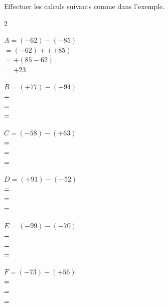 \documentclass[11pt]{article}
\begin{document}
\begin{exercice}[3]
Effectuer les calculs suivants comme dans l'exemple.

\begin{multicols}{2}

$A = (-62) - (-85)$\\
$= (-62) + (+85)$\\
$= +(85 - 62)$\\
$= +23$

\bigskip

$B = (+77) - (+94)$\\
$= \dotfill$\\
$= \dotfill$\\
$= \dotfill$

\bigskip

$C = (-58) - (+63)$\\
$= \dotfill$\\
$= \dotfill$\\
$= \dotfill$

\columnbreak

$D = (+91) - (-52)$\\
$= \dotfill$\\
$= \dotfill$\\
$= \dotfill$

\bigskip

$E = (-99) - (-70)$\\
$= \dotfill$\\
$= \dotfill$\\
$= \dotfill$

\bigskip

$F = (-73) - (+56)$\\
$= \dotfill$\\
$= \dotfill$\\
$= \dotfill$

\end{multicols}
\end{exercice}
\end{document}
